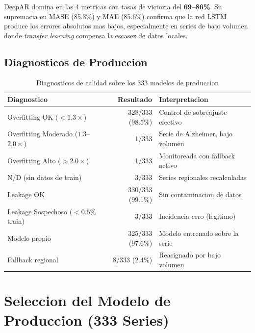 \documentclass[12pt, letterpaper]{article}
\begin{document}
DeepAR domina en las 4 metricas con tasas de victoria del \textbf{69--86\%}. Su supremacia en MASE (85.3\%) y MAE (85.6\%) confirma que la red LSTM produce los errores absolutos mas bajos, especialmente en series de bajo volumen donde \textit{transfer learning} compensa la escasez de datos locales.

\subsection{Diagnosticos de Produccion}

\begin{table}[H]
\centering
\caption{Diagnosticos de calidad sobre los 333 modelos de produccion}
\label{tab:diagnostics}
\small
\begin{tabular}{lrl}
\toprule
\textbf{Diagnostico} & \textbf{Resultado} & \textbf{Interpretacion} \\
\midrule
Overfitting OK ($<1.3\times$)          & 328/333 (98.5\%) & Control de sobreajuste efectivo \\
Overfitting Moderado ($1.3$--$2.0\times$) & 1/333          & Serie de Alzheimer, bajo volumen \\
Overfitting Alto ($>2.0\times$)         & 1/333          & Monitoreada con fallback activo \\
N/D (sin datos de train)              & 3/333          & Series regionales recalculadas \\
\midrule
Leakage OK                            & 330/333 (99.1\%) & Sin contaminacion de datos \\
Leakage Sospechoso ($<0.5\%$ train)   & 3/333          & Incidencia cero (legitimo) \\
\midrule
Modelo propio                          & 325/333 (97.6\%) & Modelo entrenado sobre la serie \\
Fallback regional                      & 8/333 (2.4\%)   & Reasignado por bajo volumen \\
\bottomrule
\end{tabular}
\end{table}

\newpage

\section{Seleccion del Modelo de Produccion (333 Series)}\label{sec:seleccion}
\end{document}
